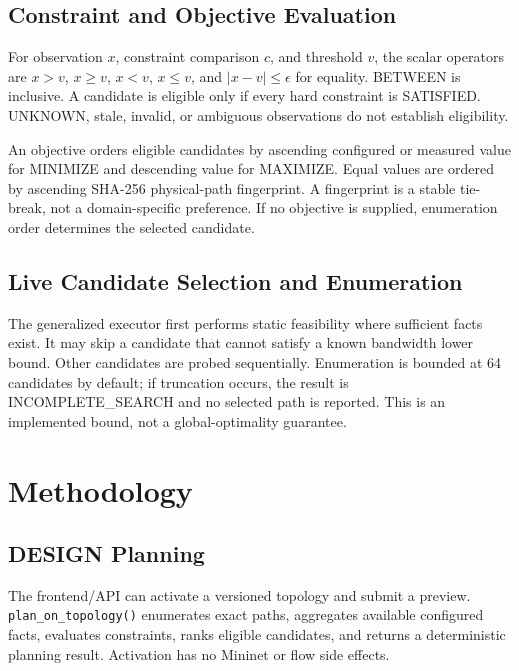 \documentclass[conference]{IEEEtran}
\begin{document}
\subsection{Constraint and Objective Evaluation}
For observation $x$, constraint comparison $c$, and threshold $v$, the scalar
operators are $x>v$, $x\ge v$, $x<v$, $x\le v$, and
$|x-v|\le\epsilon$ for equality. BETWEEN is inclusive. A candidate is eligible
only if every hard constraint is SATISFIED. UNKNOWN, stale, invalid, or
ambiguous observations do not establish eligibility.

An objective orders eligible candidates by ascending configured or measured
value for MINIMIZE and descending value for MAXIMIZE. Equal values are ordered
by ascending SHA-256 physical-path fingerprint. A fingerprint is a stable
tie-break, not a domain-specific preference. If no objective is supplied,
enumeration order determines the selected candidate.

\subsection{Live Candidate Selection and Enumeration}
The generalized executor first performs static feasibility where sufficient
facts exist. It may skip a candidate that cannot satisfy a known bandwidth
lower bound. Other candidates are probed sequentially. Enumeration is bounded
at 64 candidates by default; if truncation occurs, the result is
INCOMPLETE\_SEARCH and no selected path is reported. This is an implemented
bound, not a global-optimality guarantee.

\section{Methodology}
\subsection{DESIGN Planning}
The frontend/API can activate a versioned topology and submit a preview.
\texttt{plan\_on\_topology()} enumerates exact paths, aggregates available
configured facts, evaluates constraints, ranks eligible candidates, and
returns a deterministic planning result. Activation has no Mininet or flow
side effects.
\end{document}
